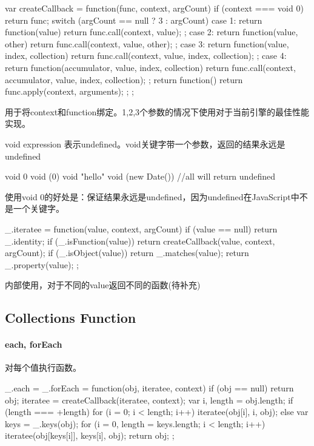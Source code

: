 \begin{JavaScript}
  var createCallback = function(func, context, argCount) {
    if (context === void 0) return func;
    switch (argCount == null ? 3 : argCount) {
      case 1: return function(value) {
        return func.call(context, value);
      };
      case 2: return function(value, other) {
        return func.call(context, value, other);
      };
      case 3: return function(value, index, collection) {
        return func.call(context, value, index, collection);
      };
      case 4: return function(accumulator, value, index, collection) {
        return func.call(context, accumulator, value, index, collection);
      };
    }
    return function() {
      return func.apply(context, arguments);
    };
  };
\end{JavaScript}

用于将context和function绑定。1,2,3个参数的情况下使用对于当前引擎的最佳性能实现。

void expression 表示undefined。void关键字带一个参数，返回的结果永远是undefined
\begin{JavaScript}
  void 0
  void (0)
  void "hello"
  void (new Date())
//all will return undefined
\end{JavaScript}
使用void 0的好处是：保证结果永远是undefined，因为undefined在JavaScript中不是一个关键字。


\begin{JavaScript}
  _.iteratee = function(value, context, argCount) {
    if (value == null) return _.identity;
    if (_.isFunction(value)) return createCallback(value, context, argCount);
    if (_.isObject(value)) return _.matches(value);
    return _.property(value);
  };
\end{JavaScript}

内部使用，对于不同的value返回不同的函数(待补充)

\subsection{Collections Function}
\paragraph{each, forEach}对每个值执行函数。
\begin{JavaScript}
  _.each = _.forEach = function(obj, iteratee, context) {
    if (obj == null) return obj;
    iteratee = createCallback(iteratee, context);
    var i, length = obj.length;
    if (length === +length) {
      for (i = 0; i < length; i++) {
        iteratee(obj[i], i, obj);
      }
    } else {
      var keys = _.keys(obj);
      for (i = 0, length = keys.length; i < length; i++) {
        iteratee(obj[keys[i]], keys[i], obj);
      }
    }
    return obj;
  };
\end{JavaScript}
	
